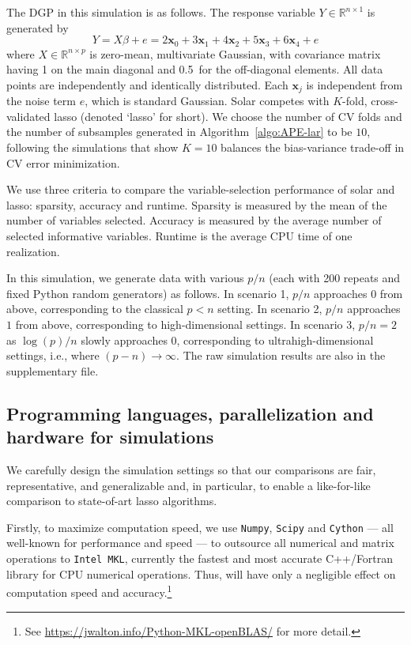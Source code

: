\documentclass[12pt]{article}
\begin{document}
The DGP in this simulation is as follows. The response variable $Y \in \mathbb{R}^{n \times 1}$ is generated by
%
\begin{equation}
%
  Y =  X\beta + e = 2 \mathbf{x}_0 + 3 \mathbf{x}_1 + 4 \mathbf{x}_2 + 5 \mathbf{x}_3 + 6 \mathbf{x}_4  + e
  \label{eqn:pop_model}
\end{equation}
%
where $X \in \mathbb{R}^{n \times p}$ is zero-mean, multivariate Gaussian, with covariance matrix having 1 on the main diagonal and 0.5~for the off-diagonal elements. All data points are independently and identically distributed. Each $\mathbf{x}_j$ is independent from the noise term $e$, which is standard Gaussian. Solar competes with $K$-fold, cross-validated lasso (denoted `lasso' for short). We choose the number of CV folds and the number of subsamples generated in Algorithm~\ref{algo:APE-lar} to be $10$, following the \citet{friedman2001elements} simulations that show $K = 10$ balances the bias-variance trade-off in CV error minimization.

We use three criteria to compare the variable-selection performance of solar and lasso: sparsity, accuracy and runtime. Sparsity is measured by the mean of the number of variables selected. Accuracy is measured by the average number of selected informative variables. Runtime is the average CPU time of one realization.

In this simulation, we generate data with various $p/n$ (each with 200 repeats and fixed Python random generators) as follows. In scenario 1, $p/n$ approaches $0$ from above, corresponding to the classical $p<n$ setting. In scenario 2, $p/n$ approaches $1$ from above, corresponding to high-dimensional settings. In scenario 3, $p/n=2$ as $\log(p)/n$ slowly approaches $0$, corresponding to ultrahigh-dimensional settings, i.e., where $(p-n)\rightarrow\infty$. The raw simulation results are also in the supplementary file.

\subsection{Programming languages, parallelization and hardware for simulations}

We carefully design the simulation settings so that our comparisons are fair, representative, and generalizable and, in particular, to enable a like-for-like comparison to state-of-art lasso algorithms.

Firstly, to maximize computation speed, we use \texttt{Numpy}, \texttt{Scipy} and \texttt{Cython} --- all well-known for performance and speed --- to outsource all numerical and matrix operations to \texttt{Intel MKL}, currently the fastest and most accurate C++/Fortran library for CPU numerical operations. Thus, will have only a negligible effect on computation speed and accuracy.\footnote{See \url{https://jwalton.info/Python-MKL-openBLAS/} for more detail.} 
\end{document}
